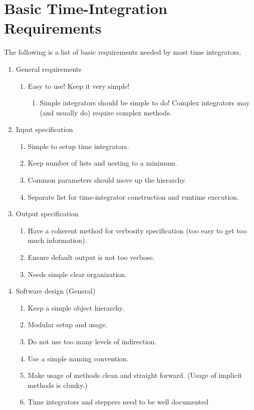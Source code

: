
\section{Basic Time-Integration Requirements}

The following is a list of basic requirements needed by most time
integrators.
\begin{enumerate}
\item General requirements

\begin{enumerate}
\item Easy to use! Keep it very simple!

\begin{enumerate}
\item Simple integrators should be simple to do! Complex integrators may
(and usually do) require complex methods.
\end{enumerate}
\end{enumerate}
\item Input specification

\begin{enumerate}
\item Simple to setup time integrators.
\item Keep number of lists and nesting to a minimum.
\item Common parameters should move up the hierarchy.
\item Separate list for time-integrator construction and runtime execution.
\end{enumerate}
\item Output specification

\begin{enumerate}
\item Have a coherent method for verbosity specification (too easy to get
too much information).
\item Ensure default output is not too verbose.
\item Needs simple clear organization.
\end{enumerate}
\item Software design (General)

\begin{enumerate}
\item Keep a simple object hierarchy.
\item Modular setup and usage.
\item Do not use too many levels of indirection.
\item Use a simple naming convention.
\item Make usage of methods clean and straight forward. (Usage of implicit
methods is clunky.)
\item Time integrators and steppers need to be well documented


\end{enumerate}
\end{enumerate}
